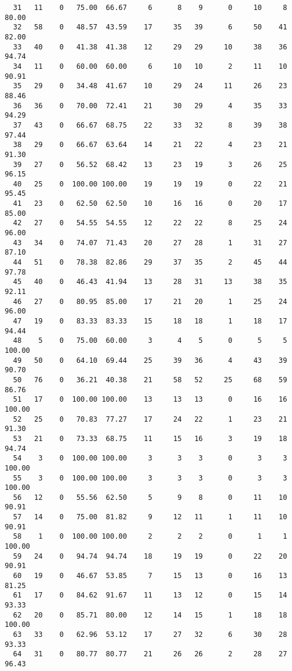\begin{verbatim}
  31   11    0   75.00  66.67     6      8    9      0     10     8    80.00
  32   58    0   48.57  43.59    17     35   39      6     50    41    82.00
  33   40    0   41.38  41.38    12     29   29     10     38    36    94.74
  34   11    0   60.00  60.00     6     10   10      2     11    10    90.91
  35   29    0   34.48  41.67    10     29   24     11     26    23    88.46
  36   36    0   70.00  72.41    21     30   29      4     35    33    94.29
  37   43    0   66.67  68.75    22     33   32      8     39    38    97.44
  38   29    0   66.67  63.64    14     21   22      4     23    21    91.30
  39   27    0   56.52  68.42    13     23   19      3     26    25    96.15
  40   25    0  100.00 100.00    19     19   19      0     22    21    95.45
  41   23    0   62.50  62.50    10     16   16      0     20    17    85.00
  42   27    0   54.55  54.55    12     22   22      8     25    24    96.00
  43   34    0   74.07  71.43    20     27   28      1     31    27    87.10
  44   51    0   78.38  82.86    29     37   35      2     45    44    97.78
  45   40    0   46.43  41.94    13     28   31     13     38    35    92.11
  46   27    0   80.95  85.00    17     21   20      1     25    24    96.00
  47   19    0   83.33  83.33    15     18   18      1     18    17    94.44
  48    5    0   75.00  60.00     3      4    5      0      5     5   100.00
  49   50    0   64.10  69.44    25     39   36      4     43    39    90.70
  50   76    0   36.21  40.38    21     58   52     25     68    59    86.76
  51   17    0  100.00 100.00    13     13   13      0     16    16   100.00
  52   25    0   70.83  77.27    17     24   22      1     23    21    91.30
  53   21    0   73.33  68.75    11     15   16      3     19    18    94.74
  54    3    0  100.00 100.00     3      3    3      0      3     3   100.00
  55    3    0  100.00 100.00     3      3    3      0      3     3   100.00
  56   12    0   55.56  62.50     5      9    8      0     11    10    90.91
  57   14    0   75.00  81.82     9     12   11      1     11    10    90.91
  58    1    0  100.00 100.00     2      2    2      0      1     1   100.00
  59   24    0   94.74  94.74    18     19   19      0     22    20    90.91
  60   19    0   46.67  53.85     7     15   13      0     16    13    81.25
  61   17    0   84.62  91.67    11     13   12      0     15    14    93.33
  62   20    0   85.71  80.00    12     14   15      1     18    18   100.00
  63   33    0   62.96  53.12    17     27   32      6     30    28    93.33
  64   31    0   80.77  80.77    21     26   26      2     28    27    96.43

\end{verbatim}

